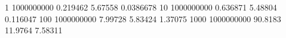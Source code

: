 1 1000000000 0.219462 5.67558 0.0386678
10 1000000000 0.636871 5.48804 0.116047
100 1000000000 7.99728 5.83424 1.37075
1000 1000000000 90.8183 11.9764 7.58311
